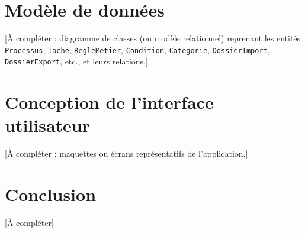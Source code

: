 \section{Mod\`ele de donn\'ees}

[\`A compl\'eter : diagramme de classes (ou mod\`ele relationnel) reprenant
les entit\'es \texttt{Processus}, \texttt{Tache}, \texttt{RegleMetier},
\texttt{Condition}, \texttt{Categorie}, \texttt{DossierImport},
\texttt{DossierExport}, etc., et leurs relations.]


\section{Conception de l'interface utilisateur}

[\`A compl\'eter : maquettes ou \'ecrans repr\'esentatifs de l'application.]

\section{Conclusion}

[\`A compl\'eter]

\clearpage

